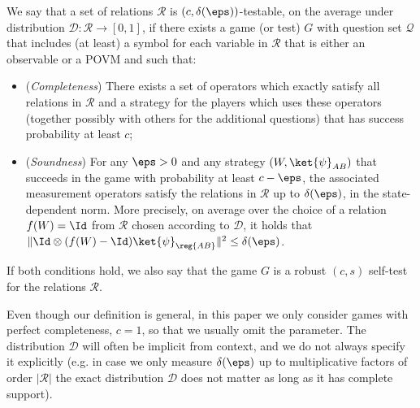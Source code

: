 \begin{definition}
We say that a set of relations $\mathcal{R}$ is $(c,\delta(\eps))$-testable, on the average under distribution $\mathcal{D}:\mathcal{R}\to[0,1]$, if
  there exists a game (or test) $G$ with question set $\mathcal{Q}$ that
  includes (at least) a symbol for each variable in $\mathcal{R}$ that is either an observable or a POVM and such that:
\begin{itemize}
\item (\emph{Completeness}) There exists a set of operators which exactly satisfy all relations in $\mathcal{R}$ and a strategy for the players which uses these operators (together possibly with others for the additional questions) that has success probability at least $c$;
\item (\emph{Soundness}) For any $\eps>0$ and any strategy $(W,\ket{\psi}_{AB})$ that succeeds in the game with probability at least $c-\eps$, the associated measurement operators satisfy the relations in $\mathcal{R}$ up to $\delta(\eps)$, in the state-dependent norm. More precisely, on average
 over the choice of a relation $f(W)=\Id$ from $\mathcal{R}$ chosen according to $\mathcal{D}$, it holds that $\| \Id\otimes (f(W)-\Id) \ket{\psi}_{\reg{AB}}\|^2 \leq \delta(\eps)$.
\end{itemize}
If both conditions hold, we also say that the game $G$ is a robust $(c,s)$ self-test for the relations $\mathcal{R}$. 
\end{definition}

Even though our definition is general, in this paper we only consider games with perfect completeness, $c=1$, so that we usually omit the parameter. The distribution $\mathcal{D}$ will often be implicit from context, and we do not always specify it explicitly (e.g. in case we only measure $\delta(\eps)$ up to multiplicative factors of order $|\mathcal{R}|$ the exact distribution $\mathcal{D}$ does not matter as long as it has complete support). 

